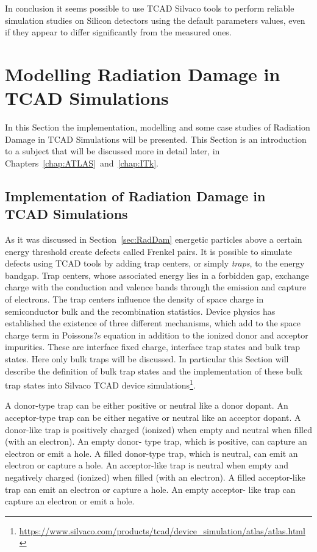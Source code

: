 In conclusion it seems possible to use TCAD Silvaco tools to perform reliable simulation studies 
on Silicon detectors using the default parameters values, even if they appear to differ significantly 
from the measured ones. 


\section{Modelling Radiation Damage in TCAD Simulations}
\label{sec:TCADRadDamage}

In this Section the implementation, modelling and some case studies of Radiation Damage in TCAD 
Simulations will be presented. This Section is an introduction to a subject that will be 
discussed more in detail later, in Chapters~\ref{chap:ATLAS}~and~\ref{chap:ITk}.

\subsection{Implementation of Radiation Damage in TCAD Simulations}
As it was discussed in Section~\ref{sec:RadDam} energetic particles above a certain energy threshold 
create defects called Frenkel pairs. 
It is possible to simulate defects using TCAD tools by adding trap centers, or simply {\it traps}, to the 
energy bandgap. 
Trap centers, whose associated energy lies in a forbidden gap, exchange charge with the conduction 
and valence bands through the emission and capture of electrons. The trap centers influence the 
density of space charge in semiconductor bulk and the recombination statistics.
Device physics has established the existence of three different mechanisms, which add to the space 
charge term in Poissons?s equation in addition to the ionized donor and acceptor impurities. These are 
interface fixed charge, interface trap states and bulk trap states. Here only bulk traps 
will be discussed. In particular this Section will describe the definition of bulk trap states and the implementation of these bulk trap states into Silvaco TCAD device simulations\footnote{\url{https://www.silvaco.com/products/tcad/device_simulation/atlas/atlas.html}}.

A donor-type trap can be either positive or neutral like a donor dopant. An acceptor-type trap can be 
either negative or neutral like an acceptor dopant. A donor-like trap is positively charged (ionized) when 
empty and neutral when filled (with an electron). An empty donor- type trap, which is positive, can 
capture an electron or emit a hole. A filled donor-type trap, which is neutral, can emit an electron or 
capture a hole. An acceptor-like trap is neutral when empty and negatively charged (ionized) when filled 
(with an electron). A filled acceptor-like trap can emit an electron or capture a hole. An empty acceptor-
like trap can capture an electron or emit a hole. 

